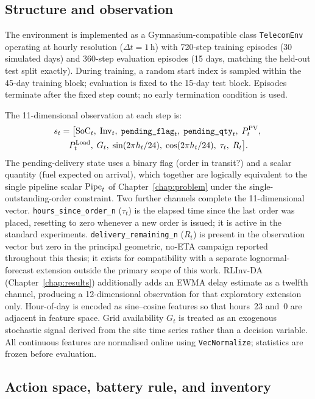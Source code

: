 \subsection{Structure and observation}

The environment is implemented as a Gymnasium-compatible class
\texttt{TelecomEnv} operating at hourly resolution ($\Delta t = 1$\,h)
with 720-step training episodes (30 simulated days) and 360-step
evaluation episodes (15 days, matching the held-out test split exactly).
During training, a random start index is sampled within the 45-day
training block; evaluation is fixed to the 15-day test block. Episodes
terminate after the fixed step count; no early termination condition is
used.

The 11-dimensional observation at each step is:
\begin{multline}
s_t = \bigl[
  \mathrm{SoC}_t,\;
  \mathrm{Inv}_t,\;
  \texttt{pending\_flag}_t,\;
  \texttt{pending\_qty}_t,\;
  P_t^{\mathrm{PV}},\; \\
  P_t^{\mathrm{Load}},\;
  G_t,\;
  \sin(2\pi h_t/24),\;
  \cos(2\pi h_t/24),\;
  \tau_t,\;
  R_t
\bigr].
\end{multline}
The pending-delivery state uses a binary flag (order in transit?) and a
scalar quantity (fuel expected on arrival), which together are logically
equivalent to the single pipeline scalar $\mathrm{Pipe}_t$ of
Chapter~\ref{chap:problem} under the single-outstanding-order constraint.
Two further channels complete the 11-dimensional vector. \texttt{hours\_since\_order\_n}
($\tau_t$) is the elapsed time since the last order was placed,
resetting to zero whenever a new order is issued; it is active in the
standard experiments. \texttt{delivery\_remaining\_n} ($R_t$) is present
in the observation vector but zero in the principal geometric,
no-ETA campaign reported throughout this thesis; it exists for
compatibility with a separate lognormal-forecast extension outside the
primary scope of this work. RLInv-DA (Chapter~\ref{chap:results})
additionally adds an EWMA delay estimate as a twelfth channel, producing
a 12-dimensional observation for that exploratory extension only.
Hour-of-day is encoded as sine--cosine features so that hours~23 and~0 are
adjacent in feature space. Grid availability $G_t$ is treated as an
exogenous stochastic signal derived from the site time series rather than
a decision variable. All continuous features are normalised online using
\texttt{VecNormalize}; statistics are frozen before evaluation.

\subsection{Action space, battery rule, and inventory}

